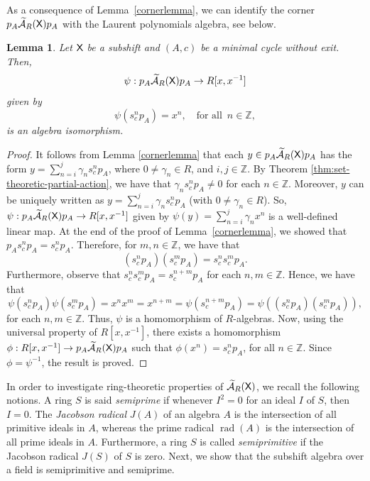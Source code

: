 \documentclass[a4paper,12pt]{amsart}
\newtheorem{lemma}[equation]{Lemma}
\theoremstyle{definition}
\theoremstyle{remark}
\numberwithin{equation}{section}
\newcommand{\osf}{{\normalfont \textsf{X}}}
\newcommand{\ualgshift}{\TCA_R(\osf)}
\newcommand{\Z}{\mathbb{Z}}
\newcommand{\CA}{\mathcal{A}}
\newcommand{\TCA}{\widetilde{\CA}}
\begin{document}
As a consequence of Lemma~\ref{cornerlemma}, we can identify the corner $p_A\ualgshift p_A$ with the Laurent polynomials algebra, see below.

\begin{lemma}\label{lem-Laurent-pol} Let $\osf$ be a subshift and $(A,c)$ be a minimal cycle without exit. Then,  $$\psi:p_A\ualgshift p_A\to R[x,x^{-1}]$$ given by
\[\psi(s^n_cp_A)=x^n, \quad \text{for all } \,n\in \Z,\]
is an algebra isomorphism.
\end{lemma}
\begin{proof} It follows from Lemma \ref{cornerlemma} that each $y\in p_A \ualgshift p_A$ has the form $y=\sum\limits_{n=i}^j\gamma_n s_c^n p_A$, where $0\neq \gamma_n\in R$, and $i,j\in \Z$. By Theorem \ref{thm:set-theoretic-partial-action},  we have that $\gamma_ns_c^n p_A\neq 0$ for each $n\in\Z$. Moreover, $y$ can be uniquely written as $y=\sum\limits_{n=i}^j\gamma_n s_c^n p_A$ (with $0\neq \gamma_n \in  R$).
So, $\psi:p_A \ualgshift p_A \rightarrow R[x,x^{-1}]$ given by $\psi(y)=\sum\limits_{n=i}^j \gamma_n x^n$ is a well-defined linear map. 
At the end of the proof of Lemma~\ref{cornerlemma}, we showed that $p_A s_c^n p_A=s_c^n p_A$. Therefore, for $m,n\in \Z$, we have that $$(s_c^np_A)(s_c^m p_A)=s_c^ns_c^mp_A.$$
Furthermore, observe that $s_c^ns_c^m p_A=s_c^{n+m}p_A$ for each $n,m\in \Z$. 
Hence, we have that $$\psi(s_c^np_A)\psi(s_c^mp_A)=x^nx^m=x^{n+m}=\psi(s_c^{n+m}p_A)=\psi((s_c^np_A)(s_c^mp_A)),$$ for each $n,m\in \Z$. 
Thus, $\psi$ is a homomorphism of $R$-algebras.
Now, using the universal property of $R[x,x^{-1}]$, there exists a homomorphism $\phi:R[x,x^{-1}]\rightarrow p_A \ualgshift p_A$ such that $\phi(x^n)=s_c^np_A$, for all $n\in \Z$. Since $\phi=\psi^{-1}$, the result is proved.
\end{proof}

In order to investigate ring-theoretic properties of $\ualgshift$, we recall the following notions. A ring $S$ is said \emph{semiprime} if whenever $I^2=0$ for an ideal $I$ of $S$, then $I=0$. 
 The \emph{Jacobson radical} $J(A)$ of an algebra $A$ is the intersection of all primitive ideals in $A$, whereas the prime radical $\operatorname{rad}(A)$ is the intersection of all prime ideals in $A$. Furthermore, a ring $S$ is called \emph{semiprimitive} if the Jacobson radical $J(S)$ of $S$ is zero. Next, we show that the subshift algebra over a field is semiprimitive and semiprime.
\end{document}
